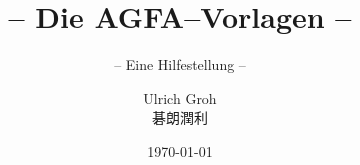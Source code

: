 \begin{titlepage}
\titlehead{Universität Tübingen \\ 
	Mathematisch-Naturwissenschaftliche Fakultät \\ 
	Fachbereich Mathematik}
\subject{-- \LaTeX --}
\title{-- Die AGFA--Vorlagen --}
\subtitle{-- Eine Hilfestellung --}
\author{Ulrich Groh \\[.25em]碁朗潤利}
\date{\today} 
\publishers{}
\end{titlepage}
\maketitle
\cleardoublepage